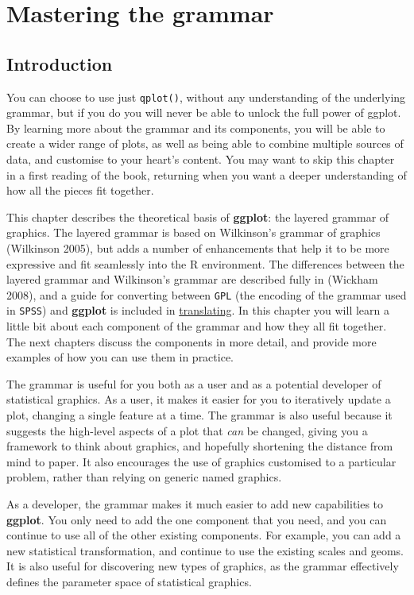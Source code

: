 \chapter{Mastering the grammar}\label{cha:mastery}

\section{Introduction}

You can choose to use just \texttt{qplot()}, without any understanding
of the underlying grammar, but if you do you will never be able to
unlock the full power of ggplot. By learning more about the grammar and
its components, you will be able to create a wider range of plots, as
well as being able to combine multiple sources of data, and customise to
your heart's content. You may want to skip this chapter in a first
reading of the book, returning when you want a deeper understanding of
how all the pieces fit together.

This chapter describes the theoretical basis of \textbf{ggplot}: the
layered grammar of graphics. The layered grammar is based on Wilkinson's
grammar of graphics (Wilkinson 2005), but adds a number of enhancements
that help it to be more expressive and fit seamlessly into the R
environment. The differences between the layered grammar and Wilkinson's
grammar are described fully in (Wickham 2008), and a guide for
converting between \texttt{GPL} (the encoding of the grammar used in
\texttt{SPSS}) and \textbf{ggplot} is included in
\hyperref[cha:translating]{translating}. In this chapter you will learn
a little bit about each component of the grammar and how they all fit
together. The next chapters discuss the components in more detail, and
provide more examples of how you can use them in practice.

The grammar is useful for you both as a user and as a potential
developer of statistical graphics. As a user, it makes it easier for you
to iteratively update a plot, changing a single feature at a time. The
grammar is also useful because it suggests the high-level aspects of a
plot that \emph{can} be changed, giving you a framework to think about
graphics, and hopefully shortening the distance from mind to paper. It
also encourages the use of graphics customised to a particular problem,
rather than relying on generic named graphics.

As a developer, the grammar makes it much easier to add new capabilities
to \textbf{ggplot}. You only need to add the one component that you
need, and you can continue to use all of the other existing components.
For example, you can add a new statistical transformation, and continue
to use the existing scales and geoms. It is also useful for discovering
new types of graphics, as the grammar effectively defines the parameter
space of statistical graphics.

